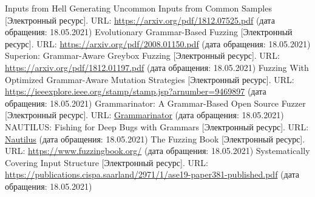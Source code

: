 \documentclass[a4paper]{article}
\begin{document}
\begin{thebibliography}{}
      Inputs from Hell Generating Uncommon Inputs from Common Samples [Электронный ресурс]. URL: \href{https://arxiv.org/pdf/1812.07525.pdf}{https://arxiv.org/pdf/1812.07525.pdf} (дата обращения: 18.05.2021)
      Evolutionary Grammar-Based Fuzzing [Электронный ресурс]. URL: \href{https://arxiv.org/pdf/2008.01150.pdf}{https://arxiv.org/pdf/2008.01150.pdf} (дата обращения: 18.05.2021)
      Superion: Grammar-Aware Greybox Fuzzing [Электронный ресурс]. URL: \href{https://arxiv.org/pdf/1812.01197.pdf}{https://arxiv.org/pdf/1812.01197.pdf} (дата обращения: 18.05.2021)
      Fuzzing With Optimized Grammar-Aware
    Mutation Strategies [Электронный ресурс]. URL: \href{https://ieeexplore.ieee.org/stamp/stamp.jsp?arnumber=9469897}{https://ieeexplore.ieee.org/stamp/stamp.jsp?arnumber=9469897} (дата обращения: 18.05.2021)
      Grammarinator:
    A Grammar-Based Open Source Fuzzer [Электронный ресурс]. 
    URL: \href{https://www.researchgate.net/publication/328510752\_Grammarinator\_a\_grammar-based\_open\_source\_fuzzer}{Grammarinator}
    (дата обращения: 18.05.2021)
      NAUTILUS:
    Fishing for Deep Bugs with Grammars [Электронный ресурс]. URL: \href{https://www.ndss-symposium.org/wp-content/uploads/2019/02/ndss2019\_04A-3\_Aschermann\_paper.pdf}{Nautilus} (дата обращения: 18.05.2021)
      The Fuzzing Book [Электронный ресурс]. URL: \href{https://www.fuzzingbook.org/}{https://www.fuzzingbook.org/} (дата обращения: 18.05.2021)
      Systematically Covering Input Structure [Электронный ресурс]. URL: \href{https://publications.cispa.saarland/2971/1/ase19-paper381-published.pdf}{https://publications.cispa.saarland/2971/1/ase19-paper381-published.pdf} (дата обращения: 18.05.2021)
\end{thebibliography}
\end{document}
